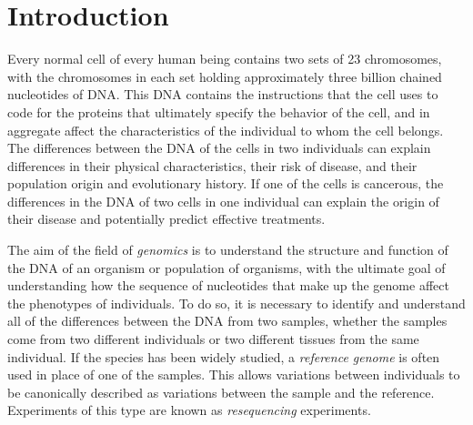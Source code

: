 \chapter{Introduction}\label{chap_introduction}


Every normal cell of every human being contains two sets of 23 chromosomes, with the chromosomes in each set holding approximately three billion chained nucleotides of DNA. This DNA contains the instructions that the cell uses to code for the proteins that ultimately specify the behavior of the cell, and in aggregate affect the characteristics of the individual to whom the cell belongs. The differences between the DNA of the cells in two individuals can explain differences in their physical characteristics, their risk of disease, and their population origin and evolutionary history. If one of the cells is cancerous, the differences in the DNA of two cells in one individual can explain the origin of their disease and potentially predict effective treatments.

The aim of the field of \emph{genomics} is to understand the structure and function of the DNA of an organism or population of organisms, with the ultimate goal of understanding how the sequence of nucleotides that make up the genome affect the phenotypes of individuals. To do so, it is necessary to identify and understand all of the differences between the DNA from two samples, whether the samples come from two different individuals or two different tissues from the same individual. If the species has been widely studied, a \emph{reference genome} is often used in place of one of the samples. This allows variations between individuals to be canonically described as variations between the sample and the reference. Experiments of this type are known as \emph{resequencing} experiments.

